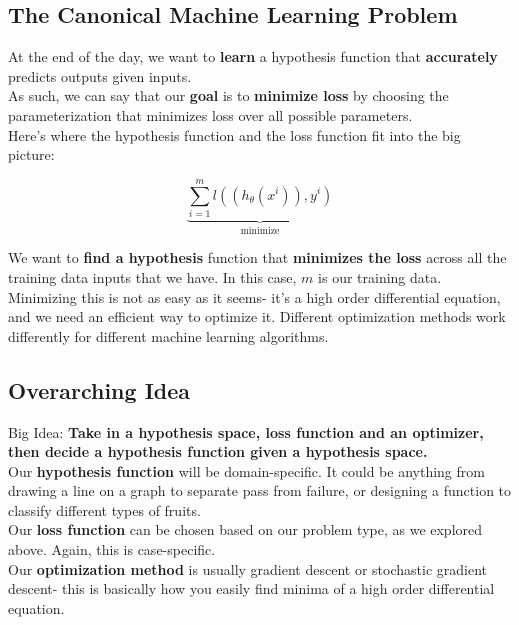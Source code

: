 \documentclass[english, 10pt]{article}
\begin{document}
\subsection{The Canonical Machine Learning Problem}

At the end of the day, we want to \textbf{learn} a hypothesis function that \textbf{accurately} predicts outputs given inputs.\\

As such, we can say that our \textbf{goal} is to \textbf{minimize loss} by choosing the parameterization that minimizes loss over all possible parameters.\\

Here's where the hypothesis function and the loss function fit into the big picture:

$$ \underbrace{\sum_{i=1}^{m}{l((h_{\theta}(x^i)), y^i)}}_{\mathrm{minimize}}$$

We want to \textbf{find a hypothesis} function that \textbf{minimizes the loss} across all the training data inputs that we have. In this case, $m$ is our training data.\\

Minimizing this is not as easy as it seems- it's a high order differential equation, and we need an efficient way to optimize it. Different optimization methods work differently for different machine learning algorithms.

\subsection{Overarching Idea}

Big Idea: \textbf{Take in a hypothesis space, loss function and an optimizer, then decide a hypothesis function given a hypothesis space.}\\

Our \textbf{hypothesis function} will be domain-specific. It could be anything from drawing a line on a graph to separate pass from failure, or designing a function to classify different types of fruits.\\

Our \textbf{loss function} can be chosen based on our problem type, as we explored above. Again, this is case-specific.\\

Our \textbf{optimization method} is usually gradient descent or stochastic gradient descent- this is basically how you easily find minima of a high order differential equation.
\end{document}
